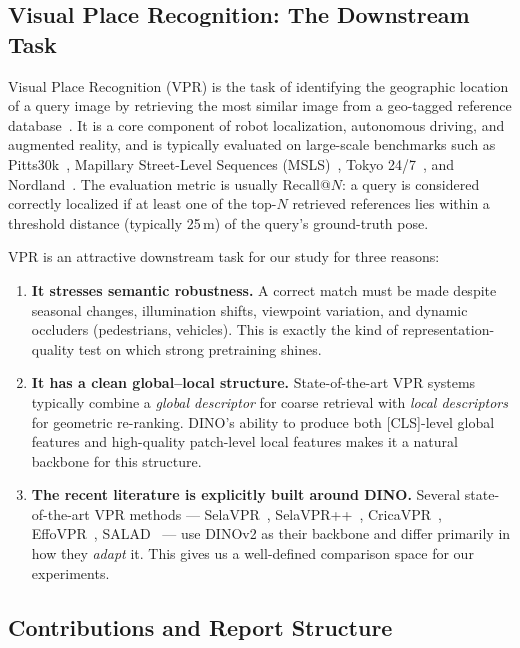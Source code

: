 \documentclass[11pt,a4paper]{article}
\begin{document}
\subsection{Visual Place Recognition: The Downstream Task}

Visual Place Recognition (VPR) is the task of identifying the geographic
location of a query image by retrieving the most similar image from a
geo-tagged reference database~\citep{lowry2015visual}. It is a core
component of robot localization, autonomous driving, and augmented reality,
and is typically evaluated on large-scale benchmarks such as
Pitts30k~\citep{torii2013visual}, Mapillary Street-Level Sequences
(MSLS)~\citep{warburg2020mapillary}, Tokyo 24/7~\citep{torii201524},
and Nordland~\citep{sunderhauf2013we}. The evaluation metric is usually
Recall@$N$: a query is considered correctly localized if at least one of
the top-$N$ retrieved references lies within a threshold distance (typically
25\,m) of the query's ground-truth pose.

VPR is an attractive downstream task for our study for three reasons:
\begin{enumerate}[leftmargin=*]
  \item \textbf{It stresses semantic robustness.} A correct match must be
  made despite seasonal changes, illumination shifts, viewpoint variation,
  and dynamic occluders (pedestrians, vehicles). This is exactly the kind of
  representation-quality test on which strong pretraining shines.
  \item \textbf{It has a clean global--local structure.} State-of-the-art VPR
  systems typically combine a \emph{global descriptor} for coarse retrieval
  with \emph{local descriptors} for geometric re-ranking. DINO's ability to
  produce both [CLS]-level global features and high-quality patch-level
  local features makes it a natural backbone for this structure.
  \item \textbf{The recent literature is explicitly built around DINO.}
  Several state-of-the-art VPR methods --- SelaVPR~\citep{lu2024selavpr},
  SelaVPR++~\citep{lu2025selavprpp}, CricaVPR~\citep{lu2024cricavpr},
  EffoVPR~\citep{tzachor2024effovpr}, SALAD~\citep{izquierdo2024optimal} ---
  use DINOv2 as their backbone and differ primarily in how they
  \emph{adapt} it. This gives us a well-defined comparison space for our
  experiments.
\end{enumerate}

\subsection{Contributions and Report Structure}
\end{document}
